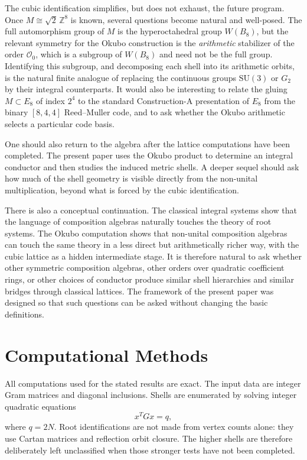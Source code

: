 \documentclass{birkjour}
\newcommand{\ZZ}{\mathbb Z}
\numberwithin{equation}{section}
\begin{document}
The cubic identification simplifies, but does not exhaust, the future program.
Once \(M\cong\sqrt2\,\ZZ^8\) is known, several questions become natural and
well-posed. The full automorphism group of \(M\) is the hyperoctahedral group
\(W(B_8)\), but the relevant symmetry for the Okubo construction is the
\emph{arithmetic} stabilizer of the order \(\mathcal{O}_0\), which is a
subgroup of \(W(B_8)\) and need not be the full group. Identifying this
subgroup, and decomposing each shell into its arithmetic orbits, is the natural
finite analogue of replacing the continuous groups \(\mathrm{SU}(3)\) or
\(G_2\) by their integral counterparts. It would also be interesting to relate
the gluing \(M\subset E_8\) of index \(2^4\) to the standard
Construction-A presentation of \(E_8\) from the binary
\([8,4,4]\) Reed--Muller code, and to ask whether the Okubo arithmetic selects
a particular code basis.

One should also return to the algebra after the lattice computations have been
completed. The present paper uses the Okubo product to determine an integral
conductor and then studies the induced metric shells. A deeper sequel should
ask how much of the shell geometry is visible directly from the non-unital
multiplication, beyond what is forced by the cubic identification.

There is also a conceptual continuation. The classical integral systems show
that the language of composition algebras naturally touches the theory of root
systems. The Okubo computation shows that non-unital composition algebras can
touch the same theory in a less direct but arithmetically richer way, with
the cubic lattice as a hidden intermediate stage. It is therefore natural to
ask whether other symmetric composition algebras, other orders over quadratic
coefficient rings, or other choices of conductor produce similar shell
hierarchies and similar bridges through classical lattices. The framework of
the present paper was designed so that such questions can be asked without
changing the basic definitions.

\section{Computational Methods}

All computations used for the stated results are exact. The input data are
integer Gram matrices and diagonal inclusions. Shells are enumerated by solving
integer quadratic equations
\begin{equation}
x^TGx=q,
\end{equation}
where \(q=2N\). Root identifications are not made from vertex counts alone:
they use Cartan matrices and reflection orbit closure. The higher shells are
therefore deliberately left unclassified when those stronger tests have not
been completed.
\end{document}
